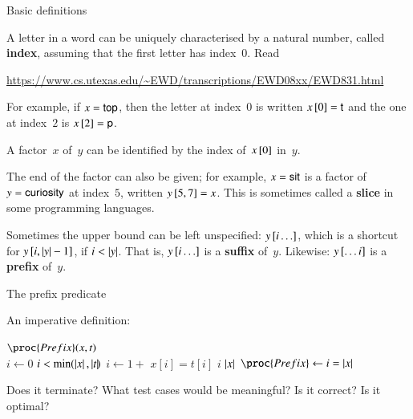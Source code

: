 %
\begin{frame}{Basic definitions}

A letter in a word can be uniquely characterised by a natural number,
called \textbf{index}, assuming that the first letter has
index~\(0\). Read

{\footnotesize\url{https://www.cs.utexas.edu/~EWD/transcriptions/EWD08xx/EWD831.html}}

\bigskip

For example, if \(x=\textsf{top}\), then the letter at index~\(0\) is
written \({x}\left[\smash{0}\right]=\textsf{t}\) and the one at index~\(2\) is
\({x}\left[\smash{2}\right]=\textsf{p}\).

\bigskip

A factor~\(x\) of~\(y\) can be identified by the index
of~\({x}\left[\smash{0}\right]\) in~\(y\).

\bigskip

The end of the factor can also be given; for example, \(x=\textsf{sit}\)
is a factor of \(y=\textsf{curiosity}\) at index~\(5\), written
\({y}\left[\smash{5,7}\right] = x\). This is sometimes called a \textbf{slice} in
some programming languages.

\bigskip

Sometimes the upper bound can be left unspecified:
\({y}\left[\smash{i\ldots}\right]\), which is a shortcut for
\({y}\left[\smash{i,\left\lvert\smash{y}\right\rvert-1}\right]\), if \(i < \left\lvert\smash{y}\right\rvert\). That is,
\({y}\left[\smash{i\ldots}\right]\) is a \textbf{suffix} of~\(y\). Likewise:
\({y}\left[\smash{\ldots i}\right]\) is a \textbf{prefix} of~\(y\).

\end{frame}

%
\begin{frame}{The prefix predicate}

An imperative definition:
\begin{codebox}
\(\proc{Prefix} (x, t)\)\\
\li \(i \gets 0\)
\li \While \(i < \text{min}(\left\lvert\smash{x}\right\rvert, \left\lvert\smash{t}\right\rvert\!)\) 
\li \> \(i \gets 1 + \)  \(x[i] = t[i]\)  \(i\)
 \(\left\lvert\smash{x}\right\rvert\)
\li \(\proc{Prefix} \gets i = \len{x}\)
\end{codebox}


Does it terminate? What test cases would be meaningful? Is it correct?
Is it optimal?

\end{frame}

